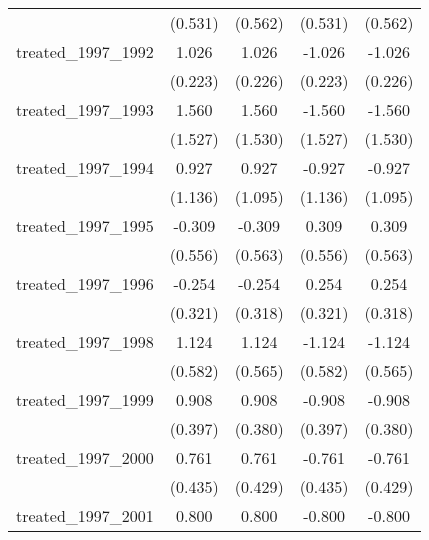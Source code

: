 {\begin{tabular}{l*{4}{c}}
            &     (0.531)         &     (0.562)         &     (0.531)         &     (0.562)         \\
[1em]
treated\_1997\_1992&       1.026\sym{***}&       1.026\sym{***}&      -1.026\sym{***}&      -1.026\sym{***}\\
            &     (0.223)         &     (0.226)         &     (0.223)         &     (0.226)         \\
[1em]
treated\_1997\_1993&       1.560         &       1.560         &      -1.560         &      -1.560         \\
            &     (1.527)         &     (1.530)         &     (1.527)         &     (1.530)         \\
[1em]
treated\_1997\_1994&       0.927         &       0.927         &      -0.927         &      -0.927         \\
            &     (1.136)         &     (1.095)         &     (1.136)         &     (1.095)         \\
[1em]
treated\_1997\_1995&      -0.309         &      -0.309         &       0.309         &       0.309         \\
            &     (0.556)         &     (0.563)         &     (0.556)         &     (0.563)         \\
[1em]
treated\_1997\_1996&      -0.254         &      -0.254         &       0.254         &       0.254         \\
            &     (0.321)         &     (0.318)         &     (0.321)         &     (0.318)         \\
[1em]
treated\_1997\_1998&       1.124         &       1.124\sym{*}  &      -1.124         &      -1.124\sym{*}  \\
            &     (0.582)         &     (0.565)         &     (0.582)         &     (0.565)         \\
[1em]
treated\_1997\_1999&       0.908\sym{*}  &       0.908\sym{*}  &      -0.908\sym{*}  &      -0.908\sym{*}  \\
            &     (0.397)         &     (0.380)         &     (0.397)         &     (0.380)         \\
[1em]
treated\_1997\_2000&       0.761         &       0.761         &      -0.761         &      -0.761         \\
            &     (0.435)         &     (0.429)         &     (0.435)         &     (0.429)         \\
[1em]
treated\_1997\_2001&       0.800         &       0.800         &      -0.800         &      -0.800         \\

\end{tabular}}
